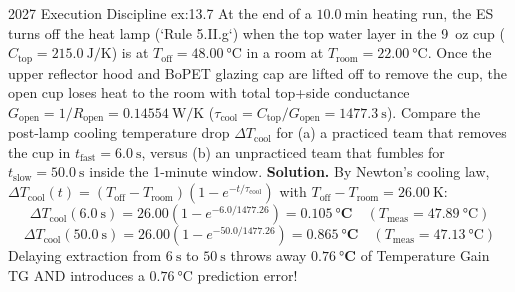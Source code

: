 \begin{workedexample}{2027 Execution Discipline }{ex:13.7}
At the end of a $\SI{10.0}{\minute}$ heating run, the ES turns off the heat lamp (`Rule 5.II.g`) when the top water layer in the 9~oz cup ($C_{\mathrm{top}} = \SI{215.0}{\joule\per\kelvin}$) is at $T_{\mathrm{off}} = \SI{48.00}{\celsius}$ in a room at $T_{\mathrm{room}} = \SI{22.00}{\celsius}$. Once the upper reflector hood and BoPET glazing cap are lifted off to remove the cup, the open cup loses heat to the room with total top+side conductance $G_{\mathrm{open}} = 1/R_{\mathrm{open}} = \SI{0.14554}{\watt\per\kelvin}$ ($\tau_{\mathrm{cool}} = C_{\mathrm{top}}/G_{\mathrm{open}} = \SI{1477.3}{\second}$). Compare the post-lamp cooling temperature drop $\Delta T_{\mathrm{cool}}$ for (a) a practiced team that removes the cup in $t_{\mathrm{fast}} = \SI{6.0}{\second}$, versus (b) an unpracticed team that fumbles for $t_{\mathrm{slow}} = \SI{50.0}{\second}$ inside the 1-minute window.
\tcblower
\textbf{Solution.} By Newton's cooling law, $\Delta T_{\mathrm{cool}}(t) = (T_{\mathrm{off}} - T_{\mathrm{room}})\left(1 - e^{-t/\tau_{\mathrm{cool}}}\right)$ with $T_{\mathrm{off}} - T_{\mathrm{room}} = \SI{26.00}{\kelvin}$:
\[
  \Delta T_{\mathrm{cool}}(\SI{6.0}{\second}) = 26.00\left(1 - e^{-6.0 / 1477.26}\right) = \mathbf{\SI{0.105}{\celsius}} \quad (T_{\mathrm{meas}} = \SI{47.89}{\celsius})
\]
\[
  \Delta T_{\mathrm{cool}}(\SI{50.0}{\second}) = 26.00\left(1 - e^{-50.0 / 1477.26}\right) = \mathbf{\SI{0.865}{\celsius}} \quad (T_{\mathrm{meas}} = \SI{47.13}{\celsius})
\]
Delaying extraction from $\SI{6}{\second}$ to $\SI{50}{\second}$ throws away $\mathbf{\SI{0.76}{\celsius}}$ of Temperature Gain $\mathrm{TG}$ AND introduces a $\SI{0.76}{\celsius}$ prediction error!
\end{workedexample}

